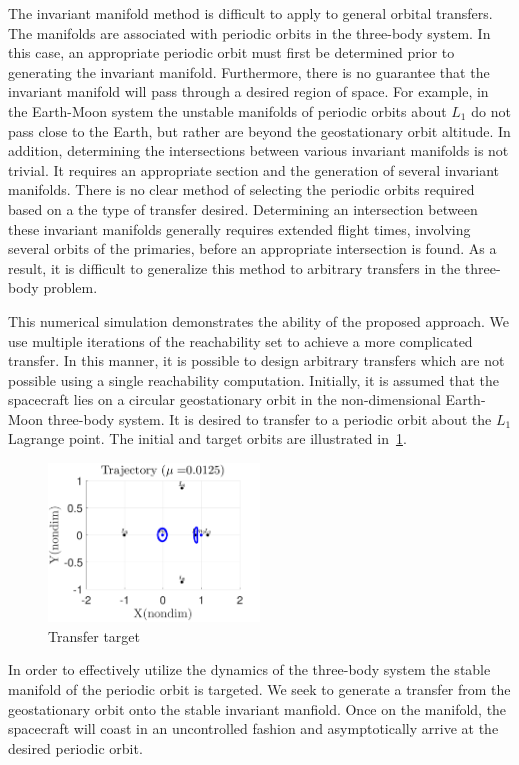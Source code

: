\documentclass[preprint]{elsarticle}
\begin{document}
The invariant manifold method is difficult to apply to general orbital transfers. 
The manifolds are associated with periodic orbits in the three-body system. 
In this case, an appropriate periodic orbit must first be determined prior to generating the invariant manifold.
Furthermore, there is no guarantee that the invariant manifold will pass through a desired region of space. 
For example, in the Earth-Moon system the unstable manifolds of periodic orbits about \( L_1 \) do not pass close to the Earth, but rather are beyond the geostationary orbit altitude. 
In addition, determining the intersections between various invariant manifolds is not trivial. 
It requires an appropriate \Poincare section and the generation of several invariant manifolds.
There is no clear method of selecting the periodic orbits required based on a the type of transfer desired. 
Determining an intersection between these invariant manifolds generally requires extended flight times, involving several orbits of the primaries, before an appropriate intersection is found.
As a result, it is difficult to generalize this method to arbitrary transfers in the three-body problem.

This numerical simulation demonstrates the ability of the proposed approach. 
We use multiple iterations of the reachability set to achieve a more complicated transfer.
In this manner, it is possible to design arbitrary transfers which are not possible using a single reachability computation.
Initially, it is assumed that the spacecraft lies on a circular geostationary orbit in the non-dimensional Earth-Moon three-body system. 
It is desired to transfer to a periodic orbit about the \( L_1 \) Lagrange point. 
The initial and target orbits are illustrated in~\cref{fig:geo_transfer_target}.
\begin{figure}[htbp]
   \centering
   \includegraphics[width=0.5\textwidth]{initial_final} %
   \caption{Transfer target}
   \label{fig:geo_transfer_target}
\end{figure}
In order to effectively utilize the dynamics of the three-body system the stable manifold of the periodic orbit is targeted.
We seek to generate a transfer from the geostationary orbit onto the stable invariant manfiold.
Once on the manifold, the spacecraft will coast in an uncontrolled fashion and asymptotically arrive at the desired periodic orbit.
\end{document}
